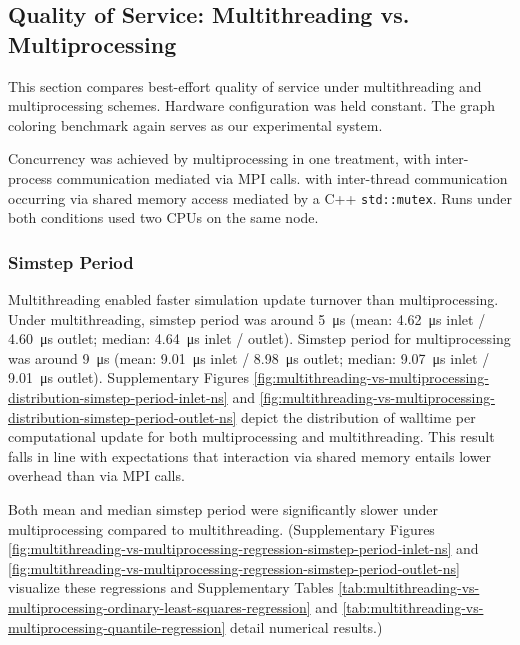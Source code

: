 \subsection{Quality of Service: Multithreading vs. Multiprocessing}
\label{sec:multithreading-vs-multiprocessing}

This section compares best-effort quality of service under multithreading and multiprocessing schemes.
Hardware configuration was held constant.
The graph coloring benchmark again serves as our experimental system.

Concurrency was achieved by multiprocessing in one treatment, with inter-process communication mediated via MPI calls.
with inter-thread communication occurring via shared memory access mediated by a C++ \texttt{std::mutex}.
Runs under both conditions used two CPUs on the same node.

\subsubsection{Simstep Period}

Multithreading enabled faster simulation update turnover than multiprocessing.
Under multithreading, simstep period was around \SI{5}{\micro\second} (mean: \SI{4.62}{\micro\second} inlet / \SI{4.60}{\micro\second} outlet; median: \SI{4.64}{\micro\second} inlet / outlet).
Simstep period for multiprocessing was around \SI{9}{\micro\second} (mean: \SI{9.01}{\micro\second} inlet / \SI{8.98}{\micro\second} outlet; median: \SI{9.07}{\micro\second} inlet / \SI{9.01}{\micro\second} outlet).
Supplementary Figures \ref{fig:multithreading-vs-multiprocessing-distribution-simstep-period-inlet-ns} and \ref{fig:multithreading-vs-multiprocessing-distribution-simstep-period-outlet-ns} depict the distribution of walltime per computational update for both multiprocessing and multithreading.
This result falls in line with expectations that interaction via shared memory entails lower overhead than via MPI calls.

Both mean and median simstep period were significantly slower under multiprocessing compared to multithreading.
(Supplementary Figures \ref{fig:multithreading-vs-multiprocessing-regression-simstep-period-inlet-ns} and \ref{fig:multithreading-vs-multiprocessing-regression-simstep-period-outlet-ns} visualize these regressions and Supplementary Tables \ref{tab:multithreading-vs-multiprocessing-ordinary-least-squares-regression} and \ref{tab:multithreading-vs-multiprocessing-quantile-regression} detail numerical results.)

